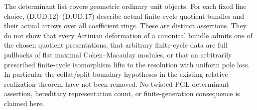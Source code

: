 \begin{remark}
The determinant list covers geometric ordinary unit objects.
For each fixed line choice, (D.UD.12)--(D.UD.17) describe actual
finite-cycle quotient bundles and their actual arrows over all
coefficient rings. These are distinct assertions. They do not
show that every Artinian deformation of a canonical bundle
admits one of the chosen quotient presentations, that arbitrary
finite-cycle data are full pullbacks of flat maximal
Cohen--Macaulay modules, or that an arbitrarily prescribed
finite-cycle isomorphism lifts to the resolution with uniform
pole loss. In particular the coflat/split-boundary hypotheses
in the existing relative realization theorem have not been
removed. No twisted-PGL determinant assertion, hereditary
representation count, or finite-generation consequence is
claimed here.
\end{remark}
